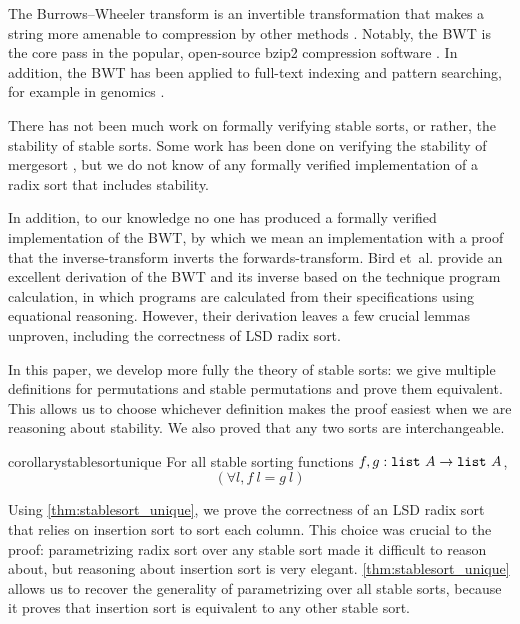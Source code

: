 \documentclass[sigplan,10pt,anonymous,review]{thesis}
\begin{document}
The Burrows--Wheeler transform is an invertible transformation that
makes a string more amenable to compression by other methods
\cite{bw}. Notably, the BWT is the core pass in the popular,
open-source bzip2 compression software \cite{tsai_2016}. In addition,
the BWT has been applied to full-text indexing and pattern searching,
for example in genomics \cite{ferragina_index, dna}.

There has not been much work on formally verifying stable sorts, or
rather, the stability of stable sorts. Some work has been done on
verifying the stability of mergesort
\cite{leroy_2018,Sternagel2013,Leino2015,deGouw2014}, but we do not
know of any formally verified implementation of a radix sort that
includes stability.

In addition, to our knowledge no one has produced a formally verified
implementation of the BWT, by which we mean an implementation with a
proof that the inverse-transform inverts the forwards-transform. Bird
et~al.\cite{alg-of-prog,birdmu} provide an excellent derivation of the
BWT and its inverse based on the technique program calculation, in
which programs are calculated from their specifications using
equational reasoning. However, their derivation leaves a few crucial
lemmas unproven, including the correctness of LSD radix sort.

In this paper, we develop more fully the theory of stable sorts: we
give multiple definitions for permutations and stable permutations and
prove them equivalent. This allows us to choose whichever definition
makes the proof easiest when we are reasoning about stability. We also
proved that any two sorts are interchangeable.
\begin{restatable*}{corollary}{stablesortunique}
  \label{thm:stablesort_unique}
  For all stable sorting functions $f, g: \texttt{\textup{list}}~A \to
  \texttt{\textup{list}}~A$,
  \begin{equation*}
    (\forall l,f~l = g~l)
  \end{equation*}
\end{restatable*}

Using \cref{thm:stablesort_unique}, we prove the correctness of an LSD
radix sort that relies on insertion sort to sort each column. This
choice was crucial to the proof: parametrizing radix sort over any
stable sort made it difficult to reason about, but reasoning about
insertion sort is very elegant. \cref{thm:stablesort_unique} allows us
to recover the generality of parametrizing over all stable sorts,
because it proves that insertion sort is equivalent to any other
stable sort.
\end{document}

